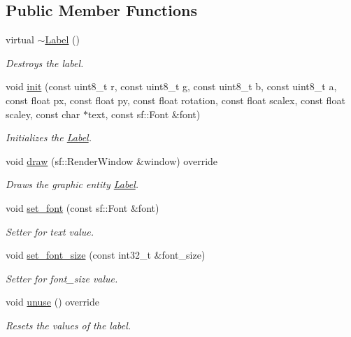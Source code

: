 \subsection*{Public Member Functions}
\begin{DoxyCompactItemize}
\item 
virtual \hyperlink{class_label_ae0405d591a2ff63c03b104435e2a3066}{$\sim$\+Label} ()
\begin{DoxyCompactList}\small\item\em Destroys the label. \end{DoxyCompactList}\item 
void \hyperlink{class_label_ab69dd0268124ac21d55b87734fd282a0}{init} (const uint8\+\_\+t r, const uint8\+\_\+t g, const uint8\+\_\+t b, const uint8\+\_\+t a, const float px, const float py, const float rotation, const float scalex, const float scaley, const char $\ast$text, const sf\+::\+Font \&font)
\begin{DoxyCompactList}\small\item\em Initializes the \hyperlink{class_label}{Label}. \end{DoxyCompactList}\item 
void \hyperlink{class_label_aa0e2a948b68c7b70dde12b06b83a0cb1}{draw} (sf\+::\+Render\+Window \&window) override
\begin{DoxyCompactList}\small\item\em Draws the graphic entity \hyperlink{class_label}{Label}. \end{DoxyCompactList}\item 
void \hyperlink{class_label_affe136b0a2e4a2240ecd30460222811d}{set\+\_\+font} (const sf\+::\+Font \&font)
\begin{DoxyCompactList}\small\item\em Setter for text value. \end{DoxyCompactList}\item 
void \hyperlink{class_label_a9e794358a782f0a4ba163bcbbe013612}{set\+\_\+font\+\_\+size} (const int32\+\_\+t \&font\+\_\+size)
\begin{DoxyCompactList}\small\item\em Setter for font\+\_\+size value. \end{DoxyCompactList}\item 
void \hyperlink{class_label_aa6a355fe8daa25c3739affcf66d66f7f}{unuse} () override
\begin{DoxyCompactList}\small\item\em Resets the values of the label. \end{DoxyCompactList}\item 

\end{DoxyCompactItemize}
